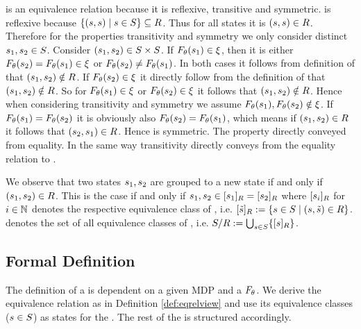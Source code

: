 \documentclass[preview]{standalone}
\begin{document}
\eqrelview is an equivalence relation because it is reflexive, transitive and symmetric. \eqrelview is reflexive because $\{({s}, {s})  \mid {s} \in {S}\} \subseteq {R}$. Thus for all states \state it is $({s}, {s}) \in {R}$. Therefore for the properties transitivity and symmetry we only consider distinct ${s}_1, {s}_2 \in {S}$. Consider $({s}_1, {s}_2) \in {S} \times {S}$. If ${F_{{\theta}}}({s}_1) \in {\xi}$, then it is either ${F_{{\theta}}}({s}_2) = {F_{{\theta}}}({s}_1) \in {\xi}$ or ${F_{{\theta}}}({s}_2) \neq {F_{\ensuremath{{\theta}}}}({s}_1)$. In both cases it follows from definition of \eqrelview that $({s}_1, {s}_2) \notin {R}$. If ${F_{{\theta}}}({s}_2) \in {\xi}$ it directly follow from the definition of \eqrelview that $({s}_1, {s}_2) \notin {R}$. So for  ${F_{{\theta}}}({s}_1) \in {\xi}$ or  ${F_{{\theta}}}({s}_2) \in {\xi}$ it follows that $({s}_1, {s}_2) \notin {R}$. Hence when considering transitivity and symmetry we assume ${F_{{\theta}}}({s}_1), {F_{{\theta}}}({s}_2) \notin {\xi}$. If ${F_{{\theta}}}({s}_1) = {F_{{\theta}}}({s}_2)$ it is obviously also ${F_{{\theta}}}({s}_2) = {F_{{\theta}}}({s}_1)$, which means if $({s}_1, {s}_2) \in {R}$ it follows that $({s}_2, {s}_1) \in {R}$. Hence \eqrelview is symmetric. The property directly conveyed from equality. In the same way transitivity directly conveys from the equality relation to \eqrelview.

We observe that two states ${s}_1, {s}_2$ are grouped to a new state if and only if $({s}_1, {s}_2) \in {R}$. This is the case if and only if ${s}_1, {s}_2 \in {\ensuremath{{[{s}_1]_{{R}}}}} = {{[{s}_2]_{{R}}}}$ where ${{[{s}_i]_{{R}}}}$ for $i \in {\mathbb{N}}$ denotes the respective equivalence class of \eqrelview, i.e. ${{[{\tilde{{s}}}]_{{R}}}} := \{{s} \in {S} \mid ({s},{\tilde{{s}}}) \in {R}\}$. \eqclasssetv denotes the set of all equivalence classes of \eqrelview, i.e. ${{{S}}/{R}} := \bigcup_{{s} \in {S}}\{{{[{s}]_{{R}}}}\}$.

\subsection{Formal Definition}

The definition of a \viewN is dependent on a given MDP and a \grpfctN ${F_{{\theta}}}$. We derive the equivalence relation \eqrelview as in Definition \ref{def:eqrelview} and use its equivalence classes \eqclassv (${s} \in {S}$) as states for the \viewN. The rest of the \chgphN is structured accordingly.
\end{document}
